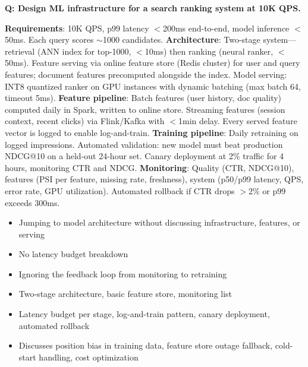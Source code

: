 \begin{interviewq}
\textbf{Q: Design ML infrastructure for a search ranking system at 10K QPS.}

 \quad {} \quad \badgefreq{\freqhigh}

\stronganswer \textbf{Requirements}: 10K QPS, p99 latency $<$200ms end-to-end, model inference $<$50ms. Each query scores $\sim$1000 candidates. \textbf{Architecture}: Two-stage system---retrieval (ANN index for top-1000, $<$10ms) then ranking (neural ranker, $<$50ms). Feature serving via online feature store (Redis cluster) for user and query features; document features precomputed alongside the index. Model serving: INT8 quantized ranker on GPU instances with dynamic batching (max batch 64, timeout 5ms). \textbf{Feature pipeline}: Batch features (user history, doc quality) computed daily in Spark, written to online store. Streaming features (session context, recent clicks) via Flink/Kafka with $<$1min delay. Every served feature vector is logged to enable log-and-train. \textbf{Training pipeline}: Daily retraining on logged impressions. Automated validation: new model must beat production NDCG@10 on a held-out 24-hour set. Canary deployment at 2\% traffic for 4 hours, monitoring CTR and NDCG. \textbf{Monitoring}: Quality (CTR, NDCG@10), features (PSI per feature, missing rate, freshness), system (p50/p99 latency, QPS, error rate, GPU utilization). Automated rollback if CTR drops $>$2\% or p99 exceeds 300ms.

\redflags
\begin{itemize}
    \item Jumping to model architecture without discussing infrastructure, features, or serving
    \item No latency budget breakdown
    \item Ignoring the feedback loop from monitoring to retraining
\end{itemize}


\goodgreat
\begin{itemize}
    \item {} Two-stage architecture, basic feature store, monitoring list
    \item {} Latency budget per stage, log-and-train pattern, canary deployment, automated rollback
    \item {} Discusses position bias in training data, feature store outage fallback, cold-start handling, cost optimization
\end{itemize}

\end{interviewq}

